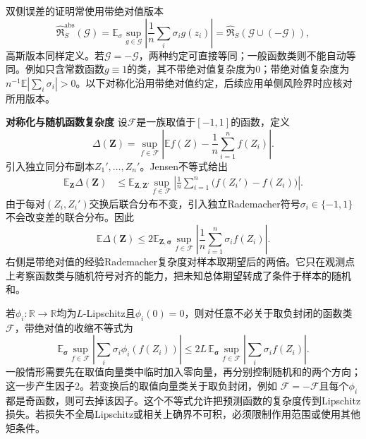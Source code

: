 双侧误差的证明常使用带绝对值版本
\[
  \widehat{\mathfrak R}^{\mathrm{abs}}_S(\mathcal G)
  =\mathbb E_\sigma\sup_{g\in\mathcal G}\left|\frac1n\sum_i\sigma_i g(z_i)\right|
  =\widehat{\mathfrak R}_S(\mathcal G\cup(-\mathcal G)),
\]
高斯版本同样定义。若\(\mathcal G=-\mathcal G\)，两种约定可直接等同；一般函数类则不能自动等同。例如只含常数函数\(g\equiv1\)的类，其不带绝对值复杂度为\(0\)；带绝对值复杂度为\(n^{-1}\mathbb E|\sum_i\sigma_i|>0\)。以下对称化沿用带绝对值约定，后续应用单侧风险界时应核对所用版本。

\par\medskip\noindent\textbf{对称化与随机函数复杂度}\quad
设\(\mathcal{F}\)是一族取值于\([-1,1]\)的函数，定义
\[ \Delta(\bm{Z})
  =\sup_{f\in\mathcal{F}}\left|\mathbb{E}f(Z)-\frac{1}{n}\sum_{i=1}^{n}f(Z_i)\right|. \]
引入独立同分布副本\(Z_1',\ldots,Z_n'\)。Jensen不等式给出
\[
\begin{aligned}
  \mathbb{E}_{\bm{Z}}\Delta(\bm{Z})
  &\leq
  \mathbb{E}_{\bm{Z},\bm{Z}'}
  \sup_{f\in\mathcal{F}}
  \left|
    \frac{1}{n}\sum_{i=1}^{n}
    \bigl(f(Z_i')-f(Z_i)\bigr)
  \right|.
\end{aligned}
\]
由于每对\((Z_i,Z_i')\)交换后联合分布不变，引入独立Rademacher符号\(\sigma_i\in\{-1,1\}\)不会改变差的联合分布。因此
\[
  \mathbb{E}\Delta(\bm{Z})
  \leq
  2\mathbb{E}_{\bm{Z},\bm{\sigma}}
  \sup_{f\in\mathcal{F}}
  \left|
    \frac{1}{n}\sum_{i=1}^{n}\sigma_i f(Z_i)
  \right|.
\]
右侧是带绝对值的经验Rademacher复杂度对样本取期望后的两倍。它只在观测点上考察函数类与随机符号对齐的能力，把未知总体期望转成了条件于样本的随机和。

若\(\phi_i:\mathbb{R}\to\mathbb{R}\)均为\(L\)-Lipschitz且\(\phi_i(0)=0\)，则对任意不必关于取负封闭的函数类\(\mathcal{F}\)，带绝对值的收缩不等式为
\[
  \mathbb{E}_{\bm{\sigma}}
  \sup_{f\in\mathcal{F}}
  \left|
    \sum_i\sigma_i\phi_i(f(Z_i))
  \right|
  \leq
  2L\,
  \mathbb{E}_{\bm{\sigma}}
  \sup_{f\in\mathcal{F}}
  \left|
    \sum_i\sigma_i f(Z_i)
  \right|.
\]
一般情形需要先在取值向量类中临时加入零向量，再分别控制随机和的两个方向；这一步产生因子\(2\)。若变换后的取值向量类关于取负封闭，例如
\(\mathcal{F}=-\mathcal{F}\)且每个\(\phi_i\)都是奇函数，则可去掉该因子。这个不等式允许把预测函数的复杂度传到Lipschitz损失。若损失不全局Lipschitz或相关上确界不可积，必须限制作用范围或使用其他矩条件。

